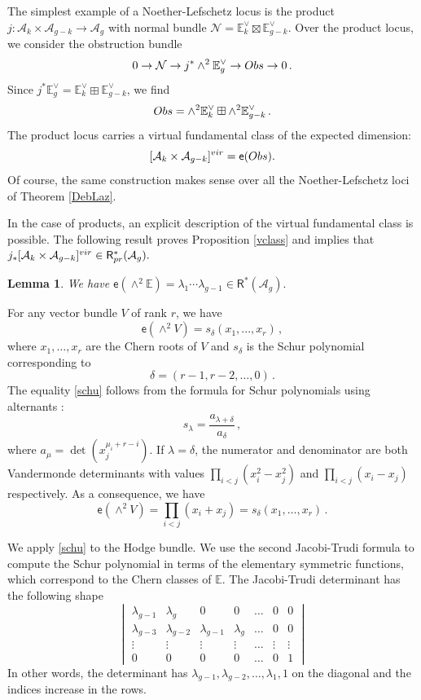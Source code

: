 \documentclass[11pt]{amsart}
\newtheorem{lem}[thm]{Lemma}
\theoremstyle{definition}
\newcommand{\R}{\mathsf{R}}
\newcommand{\A}{\mathcal{A}}
\begin{document}
{The simplest example of a Noether-Lefschetz locus is the product $j:\A_{k}\times \A_{g-k}\to \A_g$ with normal bundle  $\mathcal N=\mathbb E_k^{\vee}\boxtimes \mathbb E_{g-k}^{\vee}.$ Over the product locus, we consider the obstruction bundle $$0\to \mathcal N\to j^*\wedge^2 \mathbb E_g^{\vee}\to \textnormal{Obs}\to 0\,.$$ Since $j^*\mathbb E_g^{\vee}=\mathbb E_k^{\vee}\boxplus \mathbb E_{g-k}^{\vee}$, 
we find $$\textnormal {Obs}=\wedge^2 \mathbb E_k^{\vee}\boxplus \wedge^2\mathbb E_{g-k}^{\vee}\,.$$  The product locus carries a virtual fundamental class of the expected dimension: $$[\A_k\times \A_{g-k}]^{\textnormal{vir}}=\mathsf e(\textnormal{Obs}).$$ Of course, the same construction makes sense over all the Noether-Lefschetz loci of Theorem \ref{DebLaz}.

In the case of products, an explicit description of the virtual fundamental class is possible. The following result proves Proposition \ref{vclass} and implies that $j_{*} [\A_k\times \A_{g-k}]^{\textnormal{vir}}\in \R^*_{\textnormal{pr}}(\A_g).$

\begin{lem} We have
$\mathsf e(\wedge^2 \mathbb E)= \lambda_{1}\cdots \lambda_{g-1}\in \R^*(\A_g).$
\end{lem}
\proof For any vector bundle $V$ of rank $r$, we have 
\begin{equation} \label{schu}
\mathsf e(\wedge^2 V) = s_{\delta} (x_1, ..., x_r)\, ,
\end{equation}
where $x_1, \ldots, x_r$ are the Chern roots of $V$ and $s_{\delta}$ is the Schur polynomial corresponding to $$\delta=(r-1, r-2, \ldots, 0)\, .$$ 
The equality \eqref{schu}
follows from the formula for Schur polynomials using alternants \cite{FultonHarris}: $$s_{\lambda} = \frac{a_{\lambda+\delta}}{a_{\delta}}\, ,$$ where $a_{\mu}=\det (x_j^{\mu_i + r - i})$.   
If $\lambda= \delta$, the numerator and denominator are both Vandermonde determinants with values $\prod_{i<j} (x_i^2-x_j^2)$ and $\prod_{i<j} (x_i-x_j)$ respectively. As a consequence, we have $$\mathsf e(\wedge^2 V)=\prod_{i<j}(x_i+x_j)=s_{\delta}(x_1, \ldots, x_r)\, . $$

We apply \eqref{schu} to the Hodge bundle. We use the second Jacobi-Trudi formula to compute the Schur polynomial in terms of the elementary symmetric functions, which correspond to the Chern classes of $\mathbb E$. 
The Jacobi-Trudi determinant has the following shape 
$$\begin{vmatrix} 
  \lambda_{g-1}    &   \lambda_g        &     0    &0    &\ldots    &   0   &      0 \\  \lambda_{g-3}   &   \lambda_{g-2}   &   \lambda_{g-1} &     \lambda_g  &  \ldots &    0 & 0\\
                 \vdots & \vdots & \vdots & \vdots & \ldots &\vdots & \vdots \\
                 0 & 0 & 0 & 0 & \ldots & 0 & 1
\end{vmatrix} $$
In other words, the determinant has $\lambda_{g-1}, \lambda_{g-2},\ldots, \lambda_1, 1$ on the diagonal and the indices increase in the rows. 

}
\end{document}
